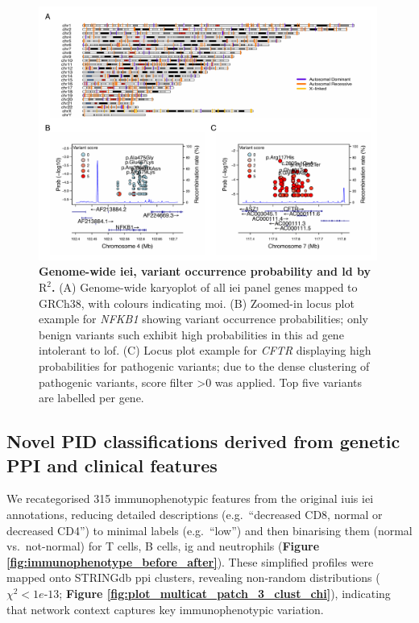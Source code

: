 \begin{figure}[ht]
  \centering
  \includegraphics[width=0.99\textwidth]{../images/karyo_locusplot_merged.pdf}
  \caption{\textbf{Genome-wide \ac{iei}, variant occurrence probability and \ac{ld} by $\text{R}^2$.} (A) Genome-wide karyoplot of all \ac{iei} panel genes mapped to GRCh38, with colours indicating \ac{moi}. (B) Zoomed-in locus plot example for \textit{NFKB1} showing variant occurrence probabilities; only benign variants such exhibit high probabilities in this \ac{ad} gene intolerant to \ac{lof}. (C) Locus plot example for \textit{CFTR} displaying high probabilities for pathogenic variants; due to the dense clustering of pathogenic variants, score filter >0 was applied. Top five variants are labelled per gene.}
  \label{fig:karyo_locusplot_merged}
\end{figure}

\FloatBarrier
\subsection{Novel PID classifications derived from genetic PPI and clinical features}
We recategorised 315 immunophenotypic features from the original \ac{iuis} \ac{iei} annotations, reducing detailed descriptions (e.g.\ “decreased CD8, normal or decreased CD4”) to minimal labels (e.g.\ “low”) and then binarising them (normal vs.\ not-normal) for T cells, B cells, \ac{ig} and neutrophils 
(\textbf{Figure \ref{fig:immunophenotype_before_after}}). 
These simplified profiles were mapped onto STRINGdb \ac{ppi} clusters, revealing non‑random distributions ($\chi^2 < 1e‑13$; 
\textbf{Figure \ref{fig:plot_multicat_patch_3_clust_chi}}), indicating that network context captures key immunophenotypic variation.

